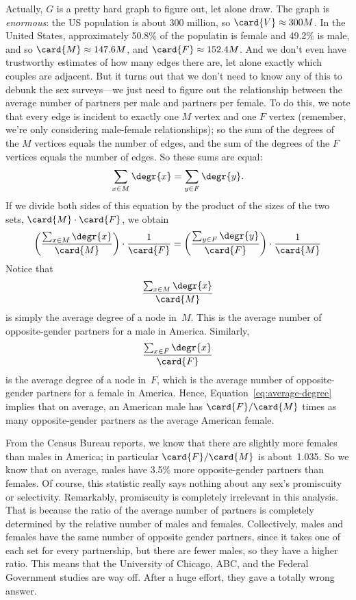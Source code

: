 Actually, $G$ is a pretty hard graph to figure out, let alone draw.
The graph is \emph{enormous}: the US population is about 300 million,
so $\card{V} \approx 300M$.  In the United States, approximately
50.8\% of the populatin is female and 49.2\% is male, and so $\card{M}
\approx 147.6M$, and $\card{F} \approx 152.4M$.  And we don't even
have trustworthy estimates of how many edges there are, let alone
exactly which couples are adjacent.  But it turns out that we don't
need to know any of this to debunk the sex surveys---we just need to
figure out the relationship between the average number of partners per
male and partners per female.  To do this, we note that every edge is
incident to exactly one $M$ vertex and one $F$ vertex (remember, we're
only considering male-female relationships); so the sum of the degrees
of the $M$ vertices equals the number of edges, and the sum of the
degrees of the $F$ vertices equals the number of edges.  So these sums
are equal:
%
\[
\sum_{x \in M} \degr{x} = \sum_{y \in F} \degr{y}.
\]
%
If we divide both sides of this equation by the product of the sizes
of the two sets, $\card{M} \cdot \card{F}$, we obtain
%
\begin{equation}\label{eq:average-degree}
\left(\frac{\sum_{x \in M} \degr{x}}{\card{M}}\right) \cdot \frac{1}{\card{F}} =
\left(\frac{\sum_{y \in F} \degr{y}}{\card{F}}\right) \cdot \frac{1}{\card{M}}
\end{equation}
Notice that
\begin{equation*}
    \frac{\sum_{x \in M} \degr{x}}{\card{M}}
\end{equation*}
is simply the average degree of a node in~$M$.  This is the average
number of opposite-gender partners for a male in America.  Similarly,
\begin{equation*}
    \frac{\sum_{x \in F} \degr{x}}{\card{F}}
\end{equation*}
is the average degree of a node in~$F$, which is the average number of
opposite-gender partners for a female in America.  Hence,
Equation~\ref{eq:average-degree} implies that on average, an American
male has $\card{F}/\card{M}$ times as many opposite-gender partners as the
average American female.

From the Census Bureau reports, we know that there are slightly more
females than males in America; in particular $\card{F} / \card{M}$ is
about~1.035.  So we know that on average, males have 3.5\% more
opposite-gender partners than females.  Of course, this statistic
really says nothing about
any sex's promiscuity or selectivity.  Remarkably, promiscuity is
completely irrelevant in this analysis.  That is because the ratio of
the average number of partners is completely determined by the
relative number of males and females.  Collectively, males and
females have the same number of opposite gender partners, since it
takes one of each set for every partnership, but there are fewer
males, so they have a higher ratio.  This means that the University of
Chicago, ABC, and the Federal Government studies are way off.  After a
huge effort, they gave a totally wrong answer.

